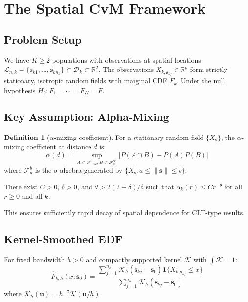 \documentclass[11pt,a4paper]{article}
\theoremstyle{definition}
\newtheorem{definition}[theorem]{Definition}
\begin{document}
\section{The Spatial CvM Framework}
\label{sec:framework}

\subsection{Problem Setup}

We have $K \geq 2$ populations with observations at spatial locations $\mathcal{L}_{n,k} = \{\mathbf{s}_{k1}, \dots, \mathbf{s}_{kn_k}\} \subset \mathcal{D}_k \subset \mathbb{R}^2$. The observations $X_{k,\mathbf{s}_{kj}} \in \mathbb{R}^p$ form strictly stationary, isotropic random fields with marginal CDF $F_k$. Under the null hypothesis $H_0: F_1 = \cdots = F_K = F$.

\subsection{Key Assumption: Alpha-Mixing}

\begin{definition}[$\alpha$-mixing coefficient]
For a stationary random field $\{X_{\mathbf{s}}\}$, the $\alpha$-mixing coefficient at distance $d$ is:
\[
\alpha(d) = \sup_{A \in \mathcal{F}_{-\infty}^{0}, B \in \mathcal{F}_{d}^{\infty}} |P(A \cap B) - P(A)P(B)|
\]
where $\mathcal{F}_{a}^{b}$ is the $\sigma$-algebra generated by $\{X_{\mathbf{s}} : a \leq \|\mathbf{s}\| \leq b\}$.
\end{definition}

\begin{assumption}
\label{ass:mixing}
There exist $C > 0$, $\delta > 0$, and $\theta > 2(2+\delta)/\delta$ such that $\alpha_k(r) \leq C r^{-\theta}$ for all $r \geq 0$ and all $k$.
\end{assumption}

This ensures sufficiently rapid decay of spatial dependence for CLT-type results.

\subsection{Kernel-Smoothed EDF}

For fixed bandwidth $h > 0$ and compactly supported kernel $\mathcal{K}$ with $\int \mathcal{K} = 1$:
\[
\hat{F}_{k,h}(x; \mathbf{s}_0) = \frac{\sum_{j=1}^{n_k} \mathcal{K}_h(\mathbf{s}_{kj} - \mathbf{s}_0) \mathbf{1}\{X_{k,\mathbf{s}_{kj}} \leq x\}}{\sum_{j=1}^{n_k} \mathcal{K}_h(\mathbf{s}_{kj} - \mathbf{s}_0)}
\]
where $\mathcal{K}_h(\mathbf{u}) = h^{-2}\mathcal{K}(\mathbf{u}/h)$.
\end{document}

